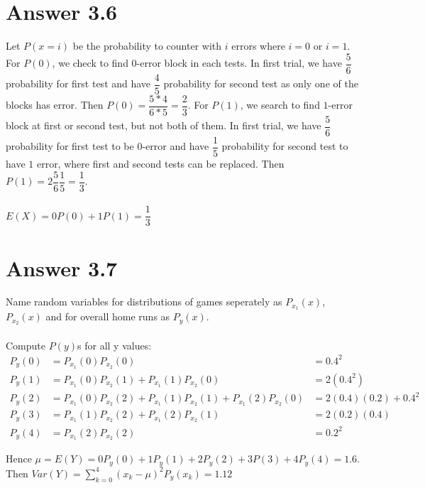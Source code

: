 \documentclass[12pt]{article}
\begin{document}
\section*{Answer 3.6}

Let $P(x=i)$ be the probability to counter with $i$ errors where $i=0$ or $i=1$. For $P(0)$, we check to find $0$-error block in each tests. In first trial, we have $\dfrac{5}{6}$ probability for first test and have $\dfrac{4}{5}$ probability for second test as only one of the blocks has error. Then $P(0)=\dfrac{5*4}{6*5}=\dfrac{2}{3}$. For $P(1)$, we search to find $1$-error block at first or second test, but not both of them. In first trial, we have $\dfrac{5}{6}$ probability for first test to be $0$-error and have $\dfrac{1}{5}$ probability for second test to have $1$ error, where first and second tests can be replaced. Then $P(1)=2\dfrac{5}{6}\dfrac{1}{5}=\dfrac{1}{3}$.\\ \\
$E(X)=0P(0)+1P(1)=\dfrac{1}{3}$


\section*{Answer 3.7}

Name random variables for distributions of games seperately as $P_{x_{1}}(x)$, $P_{x_{2}}(x)$ and for overall home runs as $P_{y}(x)$.\\ \\
Compute $P(y)$s for all y values:
\begin{align*}
	P_{y}(0) & = P_{x_{1}}(0)P_{x_{2}}(0) & = 0.4^2 \\
	P_{y}(1) & = P_{x_{1}}(0)P_{x_{2}}(1) + P_{x_{1}}(1)P_{x_{2}}(0) & = 2(0.4^2) \\
	P_{y}(2) & = P_{x_{1}}(0)P_{x_{2}}(2) + P_{x_{1}}(1)P_{x_{2}}(1) + P_{x_{1}}(2)P_{x_{2}}(0)& = 2(0.4)(0.2)+0.4^2 \\
	P_{y}(3) & = P_{x_{1}}(1)P_{x_{2}}(2) + P_{x_{1}}(2)P_{x_{2}}(1) & = 2(0.2)(0.4) \\
	P_{y}(4) & = P_{x_{1}}(2)P_{x_{2}}(2) & = 0.2^2
\end{align*}

Hence $\mu=E(Y)=0P_y(0)+1P_y(1)+2P_y(2)+3P(3)+4P_y(4)=1.6$.\\
Then $Var(Y)=\sum_{k=0}^4(x_k-\mu)^2P_y(x_k)=1.12$
\end{document}
